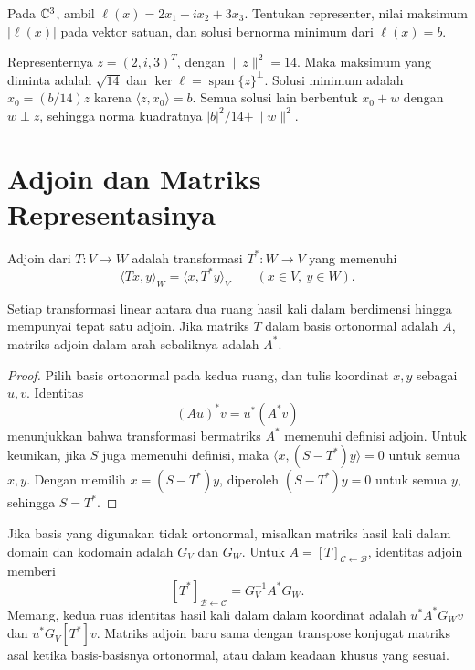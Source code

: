 \begin{exam}
    Pada $\mathbb{C}^3$, ambil $\ell(x)=2x_1-ix_2+3x_3$.
    Tentukan representer, nilai maksimum $|\ell(x)|$ pada
    vektor satuan, dan solusi bernorma minimum dari $\ell(x)=b$.
\end{exam}
\begin{solution}
    Representernya $z=(2,i,3)^T$, dengan $\|z\|^2=14$.
    Maka maksimum yang diminta adalah $\sqrt{14}$ dan
    $\ker\ell=\operatorname{span}\{z\}^\perp$.
    Solusi minimum adalah $x_0=(b/14)z$ karena
    $\langle z,x_0\rangle=b$.
    Semua solusi lain berbentuk $x_0+w$ dengan $w\perp z$,
    sehingga norma kuadratnya $|b|^2/14+\|w\|^2$.
\end{solution}

\section{Adjoin dan Matriks Representasinya}

\begin{definisi}
    Adjoin dari $T:V\to W$ adalah transformasi $T^*:W\to V$
    yang memenuhi
    \[
        \langle Tx,y\rangle_W=\langle x,T^*y\rangle_V
        \qquad(x\in V,\ y\in W).
    \]
\end{definisi}

\begin{teorema}
    Setiap transformasi linear antara dua ruang hasil kali dalam
    berdimensi hingga mempunyai tepat satu adjoin.
    Jika matriks $T$ dalam basis ortonormal adalah $A$, matriks
    adjoin dalam arah sebaliknya adalah $A^*$.
\end{teorema}
\begin{proof}
    Pilih basis ortonormal pada kedua ruang, dan tulis koordinat
    $x,y$ sebagai $u,v$. Identitas
    \[
        (Au)^*v=u^*(A^*v)
    \]
    menunjukkan bahwa transformasi bermatriks $A^*$ memenuhi
    definisi adjoin. Untuk keunikan, jika $S$ juga memenuhi definisi,
    maka $\langle x,(S-T^*)y\rangle=0$ untuk semua $x,y$.
    Dengan memilih $x=(S-T^*)y$, diperoleh $(S-T^*)y=0$
    untuk semua $y$, sehingga $S=T^*$.
\end{proof}

Jika basis yang digunakan tidak ortonormal, misalkan matriks
hasil kali dalam domain dan kodomain adalah $G_V$ dan $G_W$.
Untuk $A=[T]_{\mathcal C\leftarrow\mathcal B}$, identitas adjoin memberi
\[
    [T^*]_{\mathcal B\leftarrow\mathcal C}=G_V^{-1}A^*G_W.
\]
Memang, kedua ruas identitas hasil kali dalam dalam koordinat
adalah $u^*A^*G_Wv$ dan $u^*G_V[T^*]v$.
Matriks adjoin baru sama dengan transpose konjugat matriks asal
ketika basis-basisnya ortonormal, atau dalam keadaan khusus yang sesuai.

